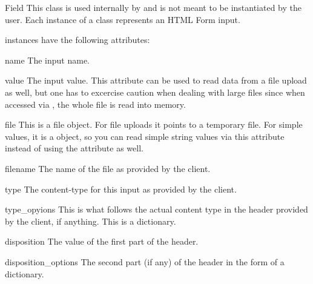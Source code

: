 \begin{classdesc}{Field}{}
This class is used internally by  and is not
meant to be instantiated by the user. Each instance of a 
class represents an HTML Form input.

 instances have the following attributes:

\begin{memberdesc}{name}
The input name.
\end{memberdesc}

\begin{memberdesc}{value}
The input value. This attribute can be used to read data from a file
upload as well, but one has to excercise caution when dealing with
large files since when accessed via , the whole file is
read into memory.
\end{memberdesc}

\begin{memberdesc}{file}
This is a file object. For file uploads it points to a temporary file.
For simple values, it is a  object, so you can read
simple string values via this attribute instead of using the 
attribute as well.
\end{memberdesc}

\begin{memberdesc}{filename}
The name of the file as provided by the client.
\end{memberdesc}

\begin{memberdesc}{type}
The content-type for this input as provided by the client.
\end{memberdesc}

\begin{memberdesc}{type_opyions}
This is what follows the actual content type in the 
header provided by the client, if anything. This is a dictionary.
\end{memberdesc}

\begin{memberdesc}{disposition}
The value of the first part of the  header.
\end{memberdesc}

\begin{memberdesc}{disposition_options}
The second part (if any) of the  header in
the form of a dictionary.
\end{memberdesc}

\begin{seealso}
\end{seealso}
\end{classdesc}

